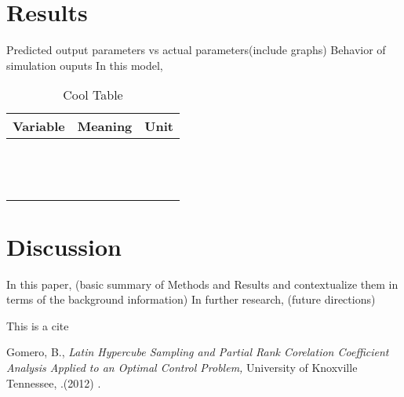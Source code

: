\documentclass{article}
\newcommand{\D}{\displaystyle}
\begin{document}
\section{Results}
Predicted output parameters vs actual parameters(include graphs)\hfill\break
Behavior of simulation ouputs\hfill\break
\hfill\break
\hfill\break
In this model,
\hfill\break
\begin{table}
\caption{Cool Table} 
\centering 
\begin{tabular}{lll}
\hline
Variable  & Meaning &Unit\\ [0.5ex]
\hline
\\
&  &  $\D\frac{\mbox{}}{}$ \\ [0.5ex]	
&  &  $\D\frac{\mbox{}}{}$ \\ [0.5ex]
& &$\D\frac{\mbox{}}{}$ \\[0.5ex]
& &  $\D\frac{\mbox{}}{}$  \\ [0.5ex]

\hline
\end{tabular}
\label{table:variables} 
\end{table}
\hfill\break





\section{Discussion}
In this paper,
(basic summary of Methods and Results and contextualize them in terms of the background information)
In further research, 
(future directions)


This is a cite \cite{one}

\begin{thebibliography}{999}

 Gomero, B., \emph{ Latin Hypercube Sampling and Partial Rank Corelation Coefficient Analysis Applied to an Optimal Control Problem,} University of Knoxville Tennessee, .(2012) .


\end{thebibliography}
\end{document}
